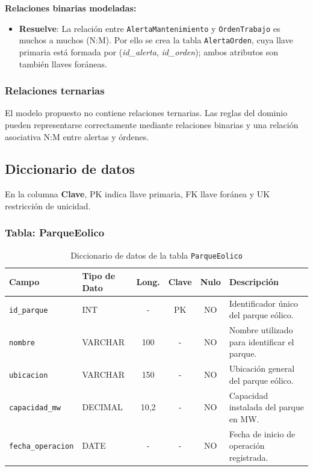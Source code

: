 \documentclass[11pt,a4paper]{article}
\begin{document}
\textbf{Relaciones binarias modeladas:}

\begin{itemize}
    \item \textbf{Resuelve}: La relación entre \texttt{AlertaMantenimiento} y
    \texttt{OrdenTrabajo} es muchos a muchos (N:M). Por ello se crea la tabla
    \texttt{AlertaOrden}, cuya llave primaria está formada por
    (\textit{id\_alerta}, \textit{id\_orden}); ambos atributos son también llaves
    foráneas.
\end{itemize}

\subsubsection{Relaciones ternarias}

El modelo propuesto no contiene relaciones ternarias. Las reglas del dominio pueden
representarse correctamente mediante relaciones binarias y una relación asociativa
N:M entre alertas y órdenes.

\subsection{Diccionario de datos}

En la columna \textbf{Clave}, PK indica llave primaria, FK llave foránea y UK
restricción de unicidad.

\par\bigskip

\subsubsection{Tabla: ParqueEolico}
\begin{table}[H]
\centering
\small
\caption{Diccionario de datos de la tabla \texttt{ParqueEolico}}
\begin{tabular}{|l|l|c|c|c|p{5.1cm}|}
\hline
\textbf{Campo} & \textbf{Tipo de Dato} & \textbf{Long.} & \textbf{Clave} & \textbf{Nulo} & \textbf{Descripción} \\ \hline
\texttt{id\_parque} & INT & - & PK & NO & Identificador único del parque eólico. \\ \hline
\texttt{nombre} & VARCHAR & 100 & - & NO & Nombre utilizado para identificar el parque. \\ \hline
\texttt{ubicacion} & VARCHAR & 150 & - & NO & Ubicación general del parque eólico. \\ \hline
\texttt{capacidad\_mw} & DECIMAL & 10,2 & - & NO & Capacidad instalada del parque en MW. \\ \hline
\texttt{fecha\_operacion} & DATE & - & - & NO & Fecha de inicio de operación registrada. \\ \hline
\end{tabular}
\end{table}
\end{document}
